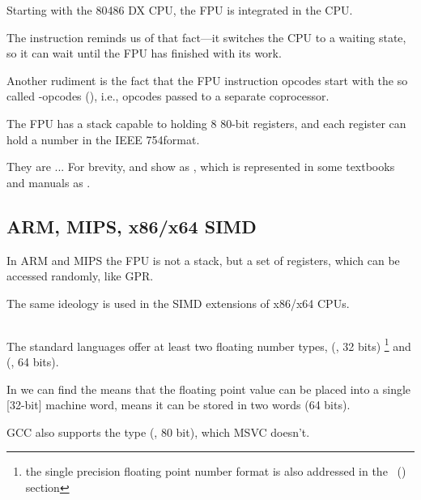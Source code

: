 Starting with the 80486 DX CPU, the \ac{FPU} is integrated in the \ac{CPU}.

The  instruction reminds us of that fact---it switches the \ac{CPU} to a waiting state, so it can wait until the \ac{FPU} has finished with its work.

Another rudiment is the fact that the \ac{FPU} instruction 
opcodes start with the so called -opcodes (), i.e., 
opcodes passed to a separate coprocessor.

\label{FPU_is_stack}

The FPU has a stack capable to holding 8 80-bit registers, and each register can hold a number 
in the IEEE 754\FNURLIEEE format.

They are ... For brevity, \IDA and \olly show  as , 
which is represented in some textbooks and manuals as .

\subsection{ARM, MIPS, x86/x64 SIMD}

In ARM and MIPS the FPU is not a stack, but a set of registers, which can be accessed randomly, like \ac{GPR}.

The same ideology is used in the SIMD extensions of x86/x64 CPUs.

\subsection{\CCpp}


The standard \CCpp languages offer at least two floating number types, \Tfloat (\FNURLSP, 32 bits)
\footnote{the single precision floating point number format is also addressed in 
the \IT{\WorkingWithFloatAsWithStructSubSubSectionName}~() section}
and \Tdouble (\FNURLDP, 64 bits).

In  we can find the  means that the floating point value can be placed into a single
[32-bit] machine word,  means it can be stored in two words (64 bits).


GCC also supports the  type (\FNURLEP, 80 bit), which MSVC doesn't.

